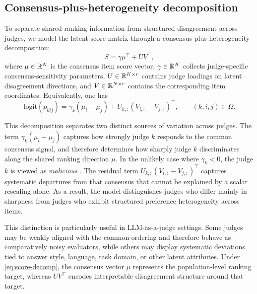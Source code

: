 \documentclass{article}
\begin{document}
\begin{bibunit}[unsrtnat]
\subsection{Consensus-plus-heterogeneity decomposition}
To separate shared ranking information from structured disagreement across judges, we model the latent score matrix through a consensus-plus-heterogeneity decomposition:
\begin{equation}
S = \gamma \mu^\top + UV^\top,
\label{eq:score-decomp}
\end{equation}
where $\mu \in \mathbb{R}^N$ is the consensus item score vector, $\gamma \in \mathbb{R}^K$ collects judge-specific consensus-sensitivity parameters, $U \in \mathbb{R}^{K \times r}$ contains judge loadings on latent disagreement directions, and $V \in \mathbb{R}^{N \times r}$ contains the corresponding item coordinates. Equivalently, one has
\begin{equation}
\mathrm{logit}(p_{kij})
=
\gamma_k(\mu_i-\mu_j)
+
U_{k,:}(V_{i,:}-V_{j,:})^\top,\qquad (k,i,j)\in\Omega.
\label{eq:judge-aware-link}
\end{equation}

This decomposition separates two distinct sources of variation across judges. The term
$\gamma_k(\mu_i-\mu_j)$ captures how strongly judge $k$ responds to the common consensus signal, and therefore determines how sharply judge $k$ discriminates along the shared ranking direction $\mu$. 
In the unlikely case where $\gamma_k<0$, the judge $k$ is viewed as \emph{malicious} \citep{chen2013crowdbt,jing2018hybrid}.
The residual term $U_{k,:}(V_{i,:}-V_{j,:})^\top$ captures systematic departures from that consensus that cannot be explained by a scalar rescaling alone. As a result, the model distinguishes judges who differ mainly in sharpness from judges who exhibit structured preference heterogeneity across items.

This distinction is particularly useful in LLM-as-a-judge settings. Some judges may be weakly aligned with the common ordering and therefore behave as comparatively noisy evaluators, while others may display systematic deviations tied to answer style, language, task domain, or other latent attributes. Under \eqref{eq:score-decomp}, the consensus vector $\mu$ represents the population-level ranking target, whereas $UV^\top$ encodes interpretable disagreement structure around that target.


\end{bibunit}
\end{document}
